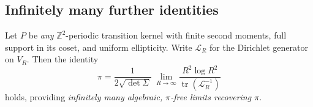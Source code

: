 \documentclass{article}
\numberwithin{equation}{section}
\theoremstyle{definition}
\theoremstyle{remark}
\DeclareMathOperator{\tr}{tr}
\begin{document}
\subsection{Infinitely many further identities}\label{app:infinite}

Let \(P\) be \emph{any} $\mathbb{Z}^{2}$-periodic transition kernel
with finite second moments, full support in its coset, and
uniform ellipticity.
Write \( \mathcal{L}_R \) for the Dirichlet generator on \( V_R \).
Then the identity
\[\pi=\frac{1}{2\sqrt{\det\Sigma}}\;\lim_{R\to\infty}\frac{R^{2}\log R^{2}}{\tr(\mathcal{L}_R^{-1})}\]
holds, providing
\emph{infinitely many algebraic, $\pi$-free limits recovering $\pi$}.

   


\end{document}
